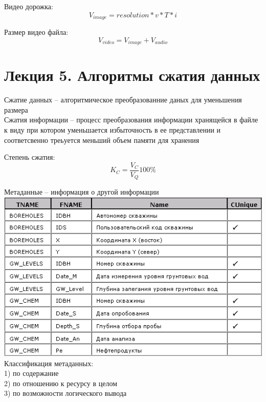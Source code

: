 \documentclass[a4paper, 12pt]{article}
\begin{document}
\begin{mdframed}[backgroundcolor=blue!20] 
      Видео дорожка:
       \[
         V_{image} = resolution * v * T * i
       \]

       Размер видео файла:
       \[
         V_{video} = V_{image} + V_{audio}
       \]
    \end{mdframed}

\newpage
\section*{Лекция 5. Алгоритмы сжатия данных}

Сжатие данных -- алгоритмическое преобразованние даных для уменьшения размера\\

Сжатия информации -- процесс преобразования информации хранящейся в файле к виду при котором уменьшается избыточность в ее представлении и соответсвенно треьуется меньший объем памяти для хранения\\

\begin{mdframed}[backgroundcolor=blue!20] 
       Степень сжатия:
       \[
         K_{C} = \frac{V_C}{V_Q} 100 \%
       \]
    \end{mdframed}
    

Метаданные -- информация о другой информации\\

\includegraphics{51}\\

Классификация метаданных:\\
1) по содержание\\
2) по отношению к ресурсу в целом\\
3) по возможности логического вывода\\
\end{document}
